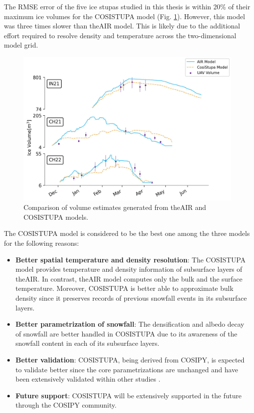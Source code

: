 The \ac{RMSE} error of the five ice stupas studied in this thesis is within 20\% of their maximum ice volumes
for the COSISTUPA model (Fig. \ref{fig:Cosistupa}).  However, this model was three times slower than the\ac{AIR} model.
This is likely due to the additional effort required to resolve density and temperature across the two-dimensional model grid.

\begin{figure}[t]
	\centering
	\includegraphics[width=\textwidth]{figs/model_compare.jpg}

	\caption{Comparison of volume estimates generated from the\ac{AIR} and COSISTUPA models.}

	\label{fig:Cosistupa}
\end{figure}

The COSISTUPA model is considered to be the best one among the three models for the following reasons:

\begin{itemize}

	\item \textbf{Better spatial temperature and density resolution}: The COSISTUPA model provides temperature and density
	      information of subsurface layers of the\ac{AIR}. In contrast, the\ac{AIR} model computes only the bulk and the
	      surface temperature. Moreover, COSISTUPA is better able to approximate bulk density since it preserves records of
	      previous snowfall events in its subsurface layers.

	\item \textbf{Better parametrization of snowfall}: The densification and albedo decay of snowfall are better
	      handled in COSISTUPA due to its awareness of the snowfall content in each of its subsurface layers.

	\item \textbf{Better validation}: COSISTUPA, being derived from COSIPY, is expected to validate better
	      since the core parametrizations are unchanged and have been extensively validated within other studies \citep{arndtAtmosphereDrivenMassBalance2021}.

	\item \textbf{Future support}: COSISTUPA will be extensively supported in the future through the COSIPY
	      community.

\end{itemize}


